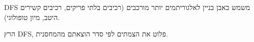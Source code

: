 DFS
משמש כאבן בניין לאלגוריתמים יותר מורכבים (רכיבים בלתי פריקים, רכיבים קשירים היטב, מיון טופולוגי).
\begin{example}
הרץ DFS, פלוט את הצמתים לפי סדר הוצאתם מהמחסנית.
\end{example}

